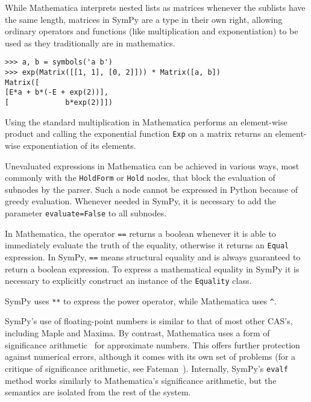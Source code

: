 
While Mathematica interprets nested lists as matrices whenever
the sublists have the same length, matrices in SymPy are a type in their own
right, allowing ordinary operators and functions (like multiplication and
exponentiation) to be used as they traditionally are in mathematics.
\begin{verbatim}
>>> a, b = symbols('a b')
>>> exp(Matrix([[1, 1], [0, 2]])) * Matrix([a, b])
Matrix([
[E*a + b*(-E + exp(2))],
[             b*exp(2)]])
\end{verbatim}

Using the standard multiplication in Mathematica performs an element-wise
product and
calling the exponential function \texttt{Exp} on a matrix
returns an element-wise exponentiation of its elements.


Unevaluated expressions in Mathematica can be achieved in various ways,
most commonly with the \texttt{HoldForm} or \texttt{Hold} nodes,
that block the evaluation of subnodes by the parser.
Such a node cannot be expressed in Python because of greedy evaluation.
Whenever needed in SymPy, it is necessary to add the parameter \texttt{evaluate=False}
to all subnodes.


In Mathematica, the operator \texttt{==} returns a boolean whenever it is able
to immediately evaluate the truth of the equality, otherwise it returns an
\texttt{Equal} expression.  In SymPy, \texttt{==} means structural equality and
is always guaranteed to return a boolean expression.  To express a mathematical equality in
SymPy it is necessary to explicitly construct an instance of the \texttt{Equality}
class.


SymPy uses \texttt{**} to express the power operator, while Mathematica uses \verb|^|.


SymPy's use of floating-point numbers is similar to that of most
other CAS's, including Maple and Maxima.
By contrast, Mathematica uses a form
of significance arithmetic~\cite{Sofroniou2005precise} for approximate numbers.
This offers further protection against numerical errors,
although it comes with its own set of problems
(for a critique of significance arithmetic, see Fateman~\cite{Fateman1992}).
Internally, SymPy's \texttt{evalf} method works similarly to Mathematica's
significance arithmetic, but the semantics are isolated from the rest of the system.
